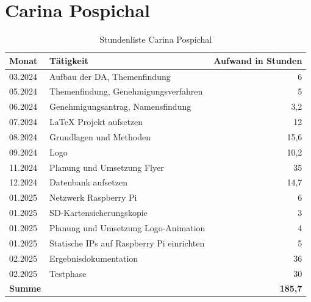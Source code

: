 \section*{Carina Pospichal}
\begin{table}[h]
	\begin{tabular}{p{2.5cm} p{10.5cm} r}
		\hline
		\textbf{Monat} & \textbf{Tätigkeit} & \textbf{Aufwand in Stunden} \\
		\hline
		03.2024 & Aufbau der DA, Themenfindung & 6 \\
		05.2024 & Themenfindung, Genehmigungsverfahren & 5 \\
		06.2024 & Genehmigungsantrag, Namensfindung & 3,2 \\
		07.2024 & LaTeX Projekt aufsetzen & 12 \\
		08.2024 & Grundlagen und Methoden & 15,6 \\
		09.2024 & Logo & 10,2 \\
		11.2024 & Planung und Umsetzung Flyer & 35 \\
		12.2024 & Datenbank aufsetzen & 14,7 \\
		01.2025 & Netzwerk Raspberry Pi & 6 \\
		01.2025 & SD-Kartensicherungskopie & 3 \\
		01.2025 & Planung und Umsetzung Logo-Animation & 4 \\
		01.2025 & Statische IPs auf Raspberry Pi einrichten & 5 \\
		02.2025 & Ergebnisdokumentation & 36 \\
		02.2025 & Testphase & 30 \\
		\hline
		\textbf{Summe} & & \textbf{185,7} \\
		\hline
	\end{tabular}
	\caption{Stundenliste Carina Pospichal}
	\label{tab:arbeitsaufwand_Pospichal}
\end{table}

\newpage


